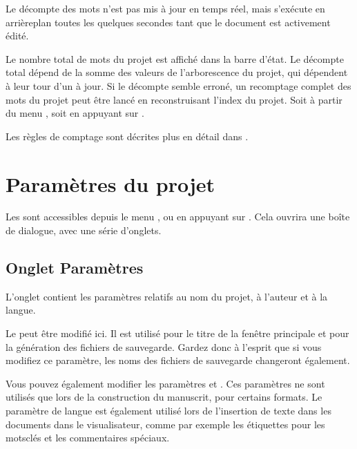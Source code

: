 \documentclass[a4paper,11pt,french]{sphinxmanual}
\begin{document}
\sphinxAtStartPar
Le décompte des mots n’est pas mis à jour en temps réel, mais s’exécute en arrière\sphinxhyphen{}plan toutes les quelques secondes tant que le document est activement édité.

\sphinxAtStartPar
Le nombre total de mots du projet est affiché dans la barre d’état. Le décompte total dépend de la somme des valeurs de l’arborescence du projet, qui dépendent à leur tour d’un {\hyperref[\detokenize{int_glossary:term-Project-Index}]{}} à jour. Si le décompte semble erroné, un recomptage complet des mots du projet peut être lancé en reconstruisant l’index du projet. Soit à partir du menu , soit en appuyant sur .

\sphinxAtStartPar
Les règles de comptage sont décrites plus en détail dans {\hyperref[\detokenize{more_counting:a-counting}]{}}.


\section{Paramètres du projet}
\label{\detokenize{project_overview:project-settings}}\label{\detokenize{project_overview:a-proj-settings}}
\sphinxAtStartPar
Les  sont accessibles depuis le menu , ou en appuyant sur . Cela ouvrira une boîte de dialogue, avec une série d’onglets.


\subsection{Onglet Paramètres}
\label{\detokenize{project_overview:settings-tab}}
\sphinxAtStartPar
L’onglet  contient les paramètres relatifs au nom du projet, à l’auteur et à la langue.

\sphinxAtStartPar
Le  peut être modifié ici. Il est utilisé pour le titre de la fenêtre principale et pour la génération des fichiers de sauvegarde. Gardez donc à l’esprit que si vous modifiez ce paramètre, les noms des fichiers de sauvegarde changeront également.

\sphinxAtStartPar
Vous pouvez également modifier les paramètres  et . Ces paramètres ne sont utilisés que lors de la construction du manuscrit, pour certains formats. Le paramètre de langue est également utilisé lors de l’insertion de texte dans les documents dans le visualisateur, comme par exemple les étiquettes pour les mots\sphinxhyphen{}clés et les commentaires spéciaux.
\end{document}

